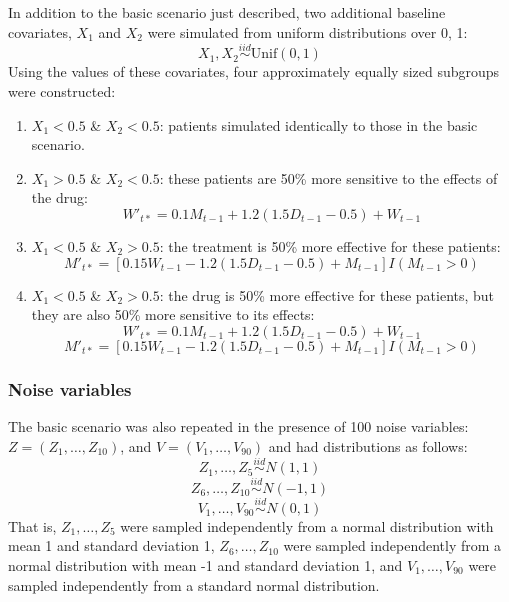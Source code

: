 \documentclass[12pt]{article}
\begin{document}
In addition to the basic scenario just described, two additional baseline covariates, $X_{1}$ and $X_{2}$ were simulated from uniform distributions over 0, 1:
\begin{equation}
  X_{1}, X_{2} \overset{iid}{\sim} \text{Unif}(0, 1) 
\end{equation}
Using the values of these covariates, four approximately equally sized subgroups were constructed:
\begin{enumerate}
  \item $X_{1} < 0.5$ \& $X_{2} < 0.5$: patients simulated identically to those in the basic scenario.
  \item $X_{1} > 0.5$ \& $X_{2} < 0.5$: these patients are 50\% more sensitive to the effects of the drug:
   \begin{equation}
   W'_{t*} = 0.1 M_{t-1} + 1.2 (1.5 D_{t-1} - 0.5) + W_{t - 1}
   \end{equation}
   \item $X_{1} < 0.5$ \& $X_{2} > 0.5$: the treatment is 50\% more effective for these patients:
\begin{equation}
M'_{t*} = [0.15 W_{t-1} - 1.2 (1.5 D_{t-1} - 0.5) + M_{t - 1}] I(M_{t-1} > 0)
\end{equation}
   \item $X_{1} < 0.5$ \& $X_{2} > 0.5$: the drug is 50\% more effective for these patients, but they are also 50\% more sensitive to its effects:
   \begin{equation}
   W'_{t*} = 0.1 M_{t-1} + 1.2 (1.5 D_{t-1} - 0.5) + W_{t - 1}
   \end{equation}
   \begin{equation}
   M'_{t*} = [0.15 W_{t-1} - 1.2 (1.5 D_{t-1} - 0.5) + M_{t - 1}] I(M_{t-1} > 0)
   \end{equation}
\end{enumerate}


\subsubsection{Noise variables} %
\label{ssub:noise_variables}

The basic scenario was also repeated in the presence of 100 noise variables:
$Z = (Z_{1}, \ldots, Z_{10})$, and $V = (V_{1}, \ldots, V_{90})$ and had distributions as follows:
\begin{equation}
  Z_{1}, \ldots, Z_{5} \overset{iid}{\sim} N(1, 1)
\end{equation}
\begin{equation}
  Z_{6}, \ldots, Z_{10} \overset{iid}{\sim} N(-1, 1)
\end{equation}
\begin{equation}
  V_{1}, \ldots, V_{90} \overset{iid}{\sim} N(0, 1)
\end{equation}
That is, $Z_{1}, \ldots, Z_{5}$ were sampled independently from a normal distribution with mean 1 and standard deviation 1, $Z_{6}, \ldots, Z_{10}$ were sampled independently from a normal distribution with mean -1 and standard deviation 1, and $V_{1}, \ldots, V_{90}$ were sampled independently from a standard normal distribution.
\end{document}
